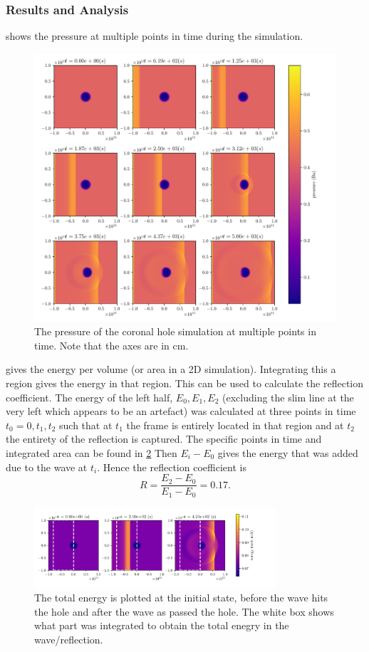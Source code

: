 \documentclass[a4paper]{article}
\numberwithin{figure}{section}
\numberwithin{equation}{section}
\begin{document}
\subsubsection{Results and Analysis} \label{sec:results_and_analysis}
 shows the pressure at multiple points in time during the simulation.
\begin{figure}[h]
	\centering
	\includegraphics[width=1\textwidth]{figures/hole_time.pdf}
	\caption{The pressure of the coronal hole simulation at multiple points in time. Note that the axes are in \si{\centi\metre}.}
	\label{fig:hole}
\end{figure}
 gives the energy per volume (or area in a 2D simulation). 
Integrating this a region gives the energy in that region. 
This can be used to calculate the reflection coefficient.
The energy of the left half, $E_0, E_1, E_2$ (excluding the slim line at the very left which appears to be an artefact) was calculated at three points in time $t_0 = 0, t_1, t_2$ such that at $t_1$ the frame is entirely located in that region and at $t_2$ the entirety of the reflection is captured. The specific points in time and integrated area can be found in \cref{fig:reflection_coefficient} Then $E_i - E_0$ gives the energy that was added due to the wave at $t_i$. Hence the reflection coefficient is \[
	R = \frac{E_2 - E_0}{E_1 - E_0} = 0.17
.\] 
\begin{figure}[ht]
	\centering
	\includegraphics[width=0.8\textwidth]{figures/calculation_reflection.pdf}
	\caption{The total energy is plotted at the initial state, before the wave hits the hole and after the wave as passed the hole. The white box shows what part was integrated to obtain the total enegry in the wave/reflection.}
	\label{fig:reflection_coefficient}
\end{figure}
\end{document}
